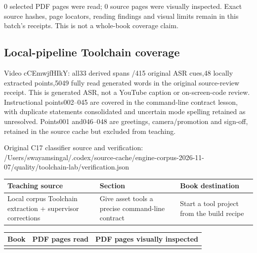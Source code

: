 0 selected PDF pages were read; 0 source pages were visually inspected. Exact source hashes, page locators, reading findings and visual limits remain in this batch's receipts. This is not a whole-book coverage claim.

\subsection{Local-pipeline Toolchain coverage}\label{appendix-877738f6f4d2-local-pipeline-toolchain-coverage}

Video cCEmwjfHIkY: all33 derived spans /415 original ASR cues,48 locally extracted points,5049 fully read generated words in the original source-review receipt. This is generated ASR, not a YouTube caption or on-screen-code review. Instructional points002--045 are covered in the command-line contract lesson, with duplicate statements consolidated and uncertain mode spelling retained as unresolved. Points001 and046--048 are greetings, camera/promotion and sign-off, retained in the source cache but excluded from teaching.

Original C17 classifier source and verification: /Users/swayamsingal/.codex/source-cache/engine-corpus-2026-11-07/quality/toolchain-lab/verification.json

{\def\LTcaptype{none} %
\begin{longtable}[]{@{}
  >{\raggedright\arraybackslash}p{}
  >{\raggedright\arraybackslash}p{}
  >{\raggedright\arraybackslash}p{}@{}}
\toprule\noalign{}
\begin{minipage}[b]{\linewidth}\raggedright
Teaching source
\end{minipage} & \begin{minipage}[b]{\linewidth}\raggedright
Section
\end{minipage} & \begin{minipage}[b]{\linewidth}\raggedright
Book destination
\end{minipage} \\
\midrule\noalign{}
\endhead
\bottomrule\noalign{}
\endlastfoot
Local corpus Toolchain extraction + supervisor corrections & Give asset tools a precise command-line contract & Start a tool project from the build recipe \\
\end{longtable}
}

{\def\LTcaptype{none} %
\begin{longtable}[]{@{}lll@{}}
\toprule\noalign{}
Book & PDF pages read & PDF pages visually inspected \\
\midrule\noalign{}
\endhead
\bottomrule\noalign{}
\endlastfoot
\end{longtable}
}


